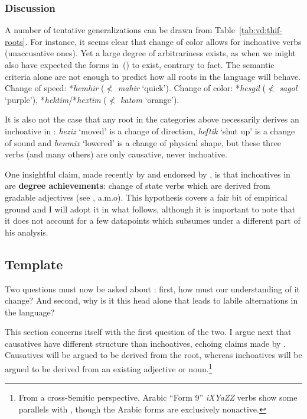 

		\subsubsection{Discussion}
A number of tentative generalizations can be drawn from Table~\ref{tab:vd:thif-roots}. For instance, it seems clear that change of color allows for inchoative verbs (unaccusative ones). Yet a large degree of arbitrariness exists, as when we might also have expected the forms in~(\nextx) to exist, contrary to fact. The semantic criteria alone are not enough to predict how all roots in the language will behave.
\pex
	\a Change of speed:
		*\emph{hemhir} ($\nless$ \emph{mahir} `quick').
	\a Change of color:
		*\emph{hesgil} ($\nless$ \emph{sagol} `purple'), *\emph{hektim}/*\emph{hextim} ($\nless$ \emph{katom} `orange').
\xe

It is also not the case that any root in the categories above necessarily derives an inchoative in {\thif}: \emph{heziz} `moved' is a change of direction, \emph{heʃtik} `shut up' is a change of sound and \emph{henmix} `lowered' is a change of physical shape, but these three verbs (and many others) are only causative, never inchoative.

One insightful claim, made recently by \cite{lev16} and endorsed by \cite{kastner18tlr}, is that inchoatives in {\thif} are \textbf{degree achievements}: change of state verbs which are derived from gradable adjectives (see \citealt{dowty91,hayetal99,rotsteinwinter04,kennedylevin08,bobaljik12}, a.m.o). This hypothesis covers a fair bit of empirical ground and I will adopt it in what follows, although it is important to note that it does not account for a few datapoints which \cite{lev16} subsumes under a different part of his analysis. 

	\subsection{Template} \label{vd:inch:template}
Two questions must now be asked about {\vd}: first, how must our understanding of it change? And second, why is it this head alone that leads to labile alternations in the language?

This section concerns itself with the first question of the two. I argue next that causatives have different structure than inchoatives, echoing claims made by \cite{borer91}. Causatives will be argued to be derived from the root, whereas inchoatives will be argued to be derived from an existing adjective or noun.\footnote{From a cross-Semitic perspective, Arabic ``Form 9'' \emph{iXYaZZ} verbs show some parallels with {\thif}, though the Arabic forms are exclusively nonactive.}

